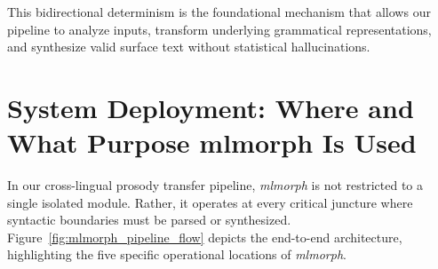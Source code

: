 This bidirectional determinism is the foundational mechanism that allows our pipeline to analyze inputs, transform underlying grammatical representations, and synthesize valid surface text without statistical hallucinations.


\section{System Deployment: Where and What Purpose mlmorph Is Used}
\label{sec:system_deployment}

In our cross-lingual prosody transfer pipeline, \textit{mlmorph} is not restricted to a single isolated module. Rather, it operates at every critical juncture where syntactic boundaries must be parsed or synthesized. Figure~\ref{fig:mlmorph_pipeline_flow} depicts the end-to-end architecture, highlighting the five specific operational locations of \textit{mlmorph}.

